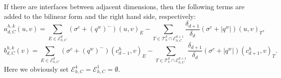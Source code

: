 \documentclass[a4paper]{article}
\def\abs#1{\lvert#1\rvert}
\def\argdot{{\hspace{0.18em}\cdot\hspace{0.18em}}}
\def\Ehcom{\mathcal E_{h,C}}         %
\def\sc#1#2{\left(#1,#2\right)}
\def\Th{\mathcal T_h}       %
\def\tn#1{{\mathbb{#1}}}    %
\begin{document}
If there are interfaces between adjacent dimensions, then the following terms are added to the bilinear form and the right hand side, respectively:
$$ a^{h,k}_{d,C}(u,v) = \sum_{E\in\Ehcom^d} (\sigma^c+(q^w)^-)\sc{u}{v}_E - \sum_{T\in\Th^d\cap\Ehcom^{d+1}} \frac{\delta_{d+1}}{\delta_d}(\sigma^c+\abs{q^w})\sc{u}{v}_T, $$
$$ b^{h,k}_{d,C}(v) = \sum_{E\in\Ehcom^d} (\sigma^c+(q^w)^-)\sc{c^h_{d-1}}{v}_E - \sum_{T\in\Th^d\cap\Ehcom^{d+1}} \frac{\delta_{d+1}}{\delta_d}(\sigma^c+\abs{q^w})\sc{c^h_{d+1}}{v}_T. $$
Here we obviously set $\Ehcom^4=\Ehcom^1=\emptyset$.

% 
% 
% 
% 
% 
% 
%   





\end{document}
